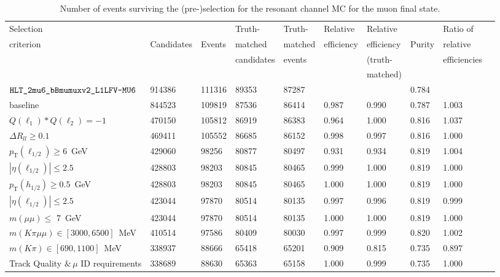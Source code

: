 \begin{table}[ht!]
  \caption{Number of events surviving the (pre-)selection for the resonant channel MC for the muon final state.}
  \centering 
  \hspace*{-1.cm}
  \small
  \begin{tabular}{l | l l| l l| l l| l |ll } 
    \hline\hline
    Selection &             &        & Truth- & Truth- & Relative & Relative &  &  Ratio of\\
    criterion & Candidates  & Events & matched & matched & efficiency & efficiency & Purity & relative \\
              &             &        & candidates & events &          & (truth- & & efficiencies\\
              &             &        &   &   &          & matched) & & \\
    	\hline
    $\verb|HLT_2mu6_bBmumuxv2_L1LFV-MU6|$& 914386 & 111316 & 89353 & 87287 &&& 0.784 &\\
    baseline& 844523 & 109819 & 87536 & 86414 & 0.987 & 0.990 & 0.787 & 1.003\\
    $Q(\ell_{1}) * Q(\ell_{2}) = -1$& 470150 & 105812 & 86919 & 86383 & 0.964 & 1.000 & 0.816 & 1.037\\
    $\Delta R_{ll}\geq  0.1$& 469411 & 105552 & 86685 & 86152 & 0.998 & 0.997 & 0.816 & 1.000\\
    $p_{\mathrm{T}}(\ell_{1/2}) \geq 6$~GeV& 429060 & 98256 & 80877 & 80497 & 0.931 & 0.934 & 0.819 & 1.004\\
    $|\eta(\ell_{1/2})| \leq 2.5$& 428803 & 98203 & 80845 & 80465 & 0.999 & 1.000 & 0.819 & 1.000\\
    $p_{\mathrm{T}}(h_{1/2}) \geq 0.5$~GeV& 428803 & 98203 & 80845 & 80465 & 1.000 & 1.000 & 0.819 & 1.000\\
    $|\eta(\ell_{1/2})| \leq 2.5$& 423044 & 97870 & 80514 & 80135 & 0.997 & 0.996 & 0.819 & 0.999\\
    $m(\mu\mu) \leq$ 7~GeV& 423044 & 97870 & 80514 & 80135 & 1.000 & 1.000 & 0.819 & 1.000\\
    \hline
    $m(K\pi \mu\mu) \in [3000,6500]$~MeV& 410514 & 97586 & 80409 & 80030 & 0.997 & 0.999 & 0.820 & 1.002\\
    $m(K\pi) \in [690,1100]$~MeV& 338937 & 88666 & 65418 & 65201 & 0.909 & 0.815 & 0.735 & 0.897\\
    Track Quality $\&\,\mu$ ID requirements& 338689 & 88630 & 65363 & 65158 & 1.000 & 0.999 & 0.735 & 1.000\\
    \hline

\end{tabular}
\end{table}
